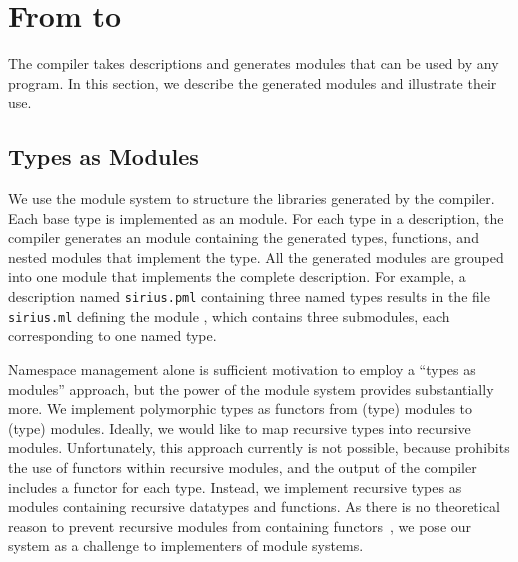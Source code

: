 \section{From \padsmlbig{} to \ocamlbig{}}
\label{sec:padsml-impl}
The \padsml{} compiler takes descriptions and generates \ocaml{}
modules that can be used by any \ocaml{} program.  In this section, we
describe the generated modules and illustrate their use.

\subsection{Types as Modules}
\label{sec:gen-code}

We use the \ocaml{} module system to structure the libraries generated
by the \padsml{} compiler.  Each \padsml{} base type is implemented as
an \ocaml{} module.  For each \padsml{} type in a description, the
\padsml{} compiler generates an \ocaml{} module containing the
generated \ocaml{} types, functions, and nested modules that implement
the \padsml{} type.  All the generated modules are grouped into one
module that implements the complete description.  For example, a
\padsml{} description named \texttt{sirius.pml} containing three named
types results in the \ocaml{} file \texttt{sirius.ml} defining the
module , which contains three submodules, each
corresponding to one named type.

Namespace management alone is sufficient motivation to employ a
``types as modules'' approach, but the power of the \ml{} module
system provides substantially more.  We implement polymorphic
\padsml{} types as functors from (type) modules to (type) modules.
Ideally, we would like to map recursive \padsml{} types into recursive
modules.  Unfortunately, this approach currently is not possible, because
\ocaml{} prohibits the use of functors within recursive modules,
and the output of the \padsml{} compiler includes a functor for each
type.  Instead, we implement recursive types as modules containing
recursive datatypes and functions.  As there is no theoretical reason
to prevent recursive modules from containing functors~\cite{dreyer-thesis}, we
pose our system as a challenge to implementers of module systems.

